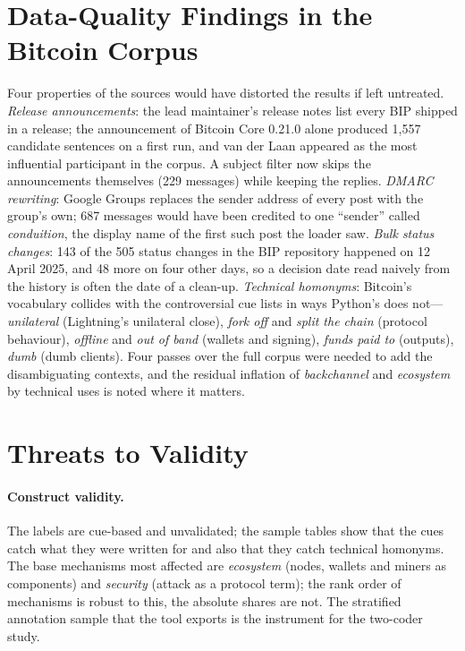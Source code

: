 \documentclass[sigconf,screen]{acmart}
\begin{document}
\section{Data-Quality Findings in the Bitcoin Corpus}
\label{sec:dataquality}

Four properties of the sources would have distorted the results if left untreated. \emph{Release announcements}: the lead maintainer's release notes list every BIP shipped in a release; the announcement of Bitcoin Core 0.21.0 alone produced 1,557 candidate sentences on a first run, and van der Laan appeared as the most influential participant in the corpus. A subject filter now skips the announcements themselves (229 messages) while keeping the replies. \emph{DMARC rewriting}: Google Groups replaces the sender address of every post with the group's own; 687 messages would have been credited to one ``sender'' called \emph{conduition}, the display name of the first such post the loader saw. \emph{Bulk status changes}: 143 of the 505 status changes in the BIP repository happened on 12 April 2025, and 48 more on four other days, so a decision date read naively from the history is often the date of a clean-up. \emph{Technical homonyms}: Bitcoin's vocabulary collides with the controversial cue lists in ways Python's does not---\emph{unilateral} (Lightning's unilateral close), \emph{fork off} and \emph{split the chain} (protocol behaviour), \emph{offline} and \emph{out of band} (wallets and signing), \emph{funds paid to} (outputs), \emph{dumb} (dumb clients). Four passes over the full corpus were needed to add the disambiguating contexts, and the residual inflation of \emph{backchannel} and \emph{ecosystem} by technical uses is noted where it matters.

\section{Threats to Validity}
\label{sec:threats}

\paragraph{Construct validity.} The labels are cue-based and unvalidated; the sample tables show that the cues catch what they were written for and also that they catch technical homonyms. The base mechanisms most affected are \emph{ecosystem} (nodes, wallets and miners as components) and \emph{security} (attack as a protocol term); the rank order of mechanisms is robust to this, the absolute shares are not. The stratified annotation sample that the tool exports is the instrument for the two-coder study.
\end{document}
